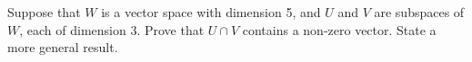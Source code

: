 Suppose that $W$ is a vector space with dimension 5, and $U$ and $V$ are subspaces of $W$, each of dimension 3.  Prove that $U\cap V$ contains a non-zero vector.  State a more general result.